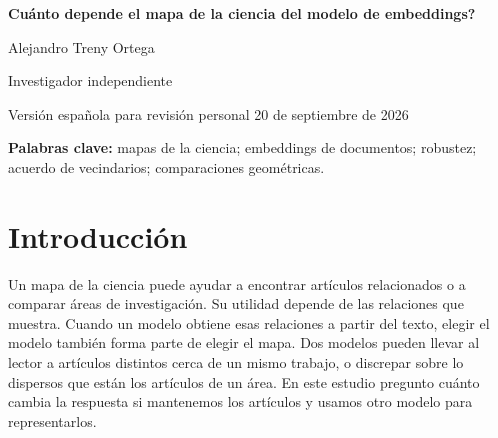 \documentclass[12pt]{article}
\begin{document}
\begin{center}
{\LARGE\bfseries \textquestiondown{}Cuánto depende el mapa de la ciencia del modelo de embeddings?\par}
\vspace{12pt}
{\large Alejandro Treny Ortega\par}
\smallskip
Investigador independiente\par
\medskip
{\small Versión española para revisión personal \textbullet{} 20 de septiembre de 2026\par}
\end{center}

\begin{abstract}
Los mapas de la ciencia describen relaciones entre artículos. Los modelos de embeddings de texto construyen esas relaciones al convertir el texto de un artículo en una lista de números que le da una posición. \textquestiondown{}Otro modelo daría la misma imagen? Comparo diez modelos con los títulos y resúmenes de 500.000 publicaciones de 2000--2024 del catálogo bibliográfico OpenAlex, repartidas en 26 disciplinas, como Medicina o Física. Representar cada disciplina mediante la posición media de sus artículos produce una organización parecida entre modelos, también al elegir otros artículos. Sin embargo, dentro de una disciplina y período, dos modelos comparten, en promedio, solo ocho de los 25 artículos más cercanos a un mismo trabajo. Darles solo los títulos también cambia buena parte de esa lista, con efectos que varían entre modelos. Los modelos también pueden discrepar sobre qué disciplina tiene sus artículos más dispersos. Cuando medimos esa dispersión mediante ángulos desde un punto común, mover ese punto puede cambiar la comparación, incluso cuando elegir otros artículos no la cambia. Estas pruebas distinguen el acuerdo entre modelos de la estabilidad al elegir artículos. La organización general puede mantenerse mientras las respuestas sobre artículos cercanos y diferencias entre disciplinas dependen del modelo, del texto que recibe y de cómo se procesa su salida.
\end{abstract}
\textbf{Palabras clave:} mapas de la ciencia; embeddings de documentos; robustez; acuerdo de vecindarios; comparaciones geométricas.

\section{Introducción}
Un mapa de la ciencia puede ayudar a encontrar artículos relacionados o a comparar áreas de investigación. Su utilidad depende de las relaciones que muestra. Cuando un modelo obtiene esas relaciones a partir del texto, elegir el modelo también forma parte de elegir el mapa. Dos modelos pueden llevar al lector a artículos distintos cerca de un mismo trabajo, o discrepar sobre lo dispersos que están los artículos de un área. En este estudio pregunto cuánto cambia la respuesta si mantenemos los artículos y usamos otro modelo para representarlos.
\end{document}
